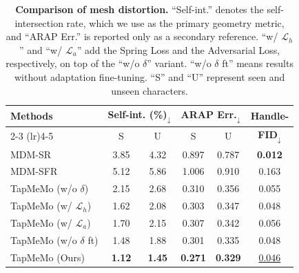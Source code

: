 \documentclass[lettersize,journal]{IEEEtran}
\newcommand{\blu}[1]{\texorpdfstring{{\leavevmode\color{blue}#1}}{#1}}
\begin{document}
\begin{table}[t]
  \centering
  \setlength{\abovecaptionskip}{0.5mm}
  \setlength{\belowcaptionskip}{0mm}
  \renewcommand{\arraystretch}{1.3}
  \scriptsize
  \setlength{\tabcolsep}{0pt}
  \caption{\textbf{Comparison of mesh distortion.} ``Self-int.'' \blu{denotes the
  self-intersection rate, which we use as the primary geometry metric, and ``ARAP Err.'' is
  reported only as a secondary reference.} ``w/ \blu{$\mathcal{L}_h$'' and ``w/ $\mathcal{L}_a$''
  add the Spring Loss and the Adversarial Loss, respectively, on top of the} ``w/o $\delta$\blu{''
  variant. ``w/o $\delta$} ft'' means results without adaptation fine-tuning. ``S'' and
  ``U'' represent seen and unseen characters.}
  \label{table:2}
  \begin{tabular*}{\linewidth}{@{\extracolsep{\fill}} l ccccc @{}}
    \toprule[1.5pt]
    \textbf{Methods} & \multicolumn{2}{c}{\blu{\textbf{Self-int.} (\%)$_{\downarrow}$}}
                     & \multicolumn{2}{c}{\blu{\textbf{ARAP Err.}$_{\downarrow}$}}
                     & \textbf{\blu{Handle-}} \\
    \cmidrule(lr){2-3} \cmidrule(lr){4-5}
                     & \blu{S} & \blu{U} & \blu{S} & \blu{U} & \blu{\textbf{FID}}$_{\downarrow}$ \\
    \midrule[0.5pt]
    MDM-SR  & \blu{3.85} & \blu{4.32} & 0.897 & 0.787 & \textbf{0.012} \\
    MDM-SFR & \blu{5.12} & \blu{5.86} & 1.006 & 0.910 & 0.163 \\
    \midrule[0.5pt]
    TapMeMo (w/o $\delta$)         & \blu{2.15} & \blu{2.68} & 0.310 & 0.356 & 0.055 \\
    TapMeMo (w/ $\mathcal{L}_{h}$) & \blu{1.62} & \blu{2.08} & 0.303 & 0.347 & 0.048 \\
    TapMeMo (w/ $\mathcal{L}_{a}$) & \blu{1.70} & \blu{2.15} & 0.307 & 0.342 & 0.056 \\
    TapMeMo (w/o $\delta$ ft)      & \blu{1.48} & \blu{1.88} & 0.301 & 0.335 & 0.048 \\
    TapMeMo (Ours)                 & \blu{\textbf{1.12}} & \blu{\textbf{1.45}} & \textbf{0.271}
                                   & \textbf{0.329} & \underline{0.046} \\
    \bottomrule[1.5pt]
  \end{tabular*}
\end{table}
\end{document}
